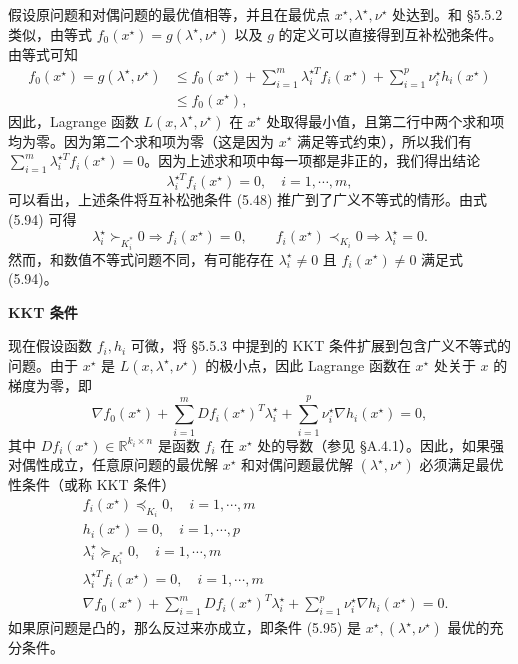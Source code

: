 \documentclass[UTF8, 12pt, fontset=fandol, oneside]{ctexart}
\begin{document}
假设原问题和对偶问题的最优值相等，并且在最优点 $x^\star,\lambda^\star,\nu^\star$ 处达到。和 §5.5.2 类似，由等式 $f_0(x^\star)=g(\lambda^\star,\nu^\star)$ 以及 $g$ 的定义可以直接得到互补松弛条件。由等式可知
\[
\begin{aligned}
f_0(x^\star)=g(\lambda^\star,\nu^\star)
&\leq f_0(x^\star)+\sum_{i=1}^m\lambda_i^{\star T}f_i(x^\star)+\sum_{i=1}^p\nu_i^\star h_i(x^\star)\\
&\leq f_0(x^\star),
\end{aligned}
\]
因此，Lagrange 函数 $L(x,\lambda^\star,\nu^\star)$ 在 $x^\star$ 处取得最小值，且第二行中两个求和项均为零。因为第二个求和项为零（这是因为 $x^\star$ 满足等式约束），所以我们有 $\sum_{i=1}^m\lambda_i^{\star T}f_i(x^\star)=0$。因为上述求和项中每一项都是非正的，我们得出结论
\begin{equation}
\lambda_i^{\star T}f_i(x^\star)=0,\quad i=1,\cdots,m,
\tag{5.94}
\end{equation}
可以看出，上述条件将互补松弛条件 (5.48) 推广到了广义不等式的情形。由式 (5.94) 可得
\[
\lambda_i^\star\succ_{K_i^\ast}0\Longrightarrow f_i(x^\star)=0,\qquad
f_i(x^\star)\prec_{K_i}0\Longrightarrow \lambda_i^\star=0.
\]
然而，和数值不等式问题不同，有可能存在 $\lambda_i^\star\neq 0$ 且 $f_i(x^\star)\neq 0$ 满足式 (5.94)。

\noindent\textbf{KKT 条件}

现在假设函数 $f_i,h_i$ 可微，将 §5.5.3 中提到的 KKT 条件扩展到包含广义不等式的问题。由于 $x^\star$ 是 $L(x,\lambda^\star,\nu^\star)$ 的极小点，因此 Lagrange 函数在 $x^\star$ 处关于 $x$ 的梯度为零，即
\[
\nabla f_0(x^\star)+\sum_{i=1}^m Df_i(x^\star)^T\lambda_i^\star+\sum_{i=1}^p\nu_i^\star\nabla h_i(x^\star)=0,
\]
其中 $Df_i(x^\star)\in\mathbb{R}^{k_i\times n}$ 是函数 $f_i$ 在 $x^\star$ 处的导数（参见 §A.4.1）。因此，如果强对偶性成立，任意原问题的最优解 $x^\star$ 和对偶问题最优解 $(\lambda^\star,\nu^\star)$ 必须满足最优性条件（或称 KKT 条件）
\begin{equation}
\begin{aligned}
& f_i(x^\star)\preceq_{K_i}0,\quad i=1,\cdots,m\\
& h_i(x^\star)=0,\quad i=1,\cdots,p\\
& \lambda_i^\star\succeq_{K_i^\ast}0,\quad i=1,\cdots,m\\
& \lambda_i^{\star T}f_i(x^\star)=0,\quad i=1,\cdots,m\\
& \nabla f_0(x^\star)+\sum_{i=1}^m Df_i(x^\star)^T\lambda_i^\star+\sum_{i=1}^p\nu_i^\star\nabla h_i(x^\star)=0.
\end{aligned}
\tag{5.95}
\end{equation}
如果原问题是凸的，那么反过来亦成立，即条件 (5.95) 是 $x^\star,(\lambda^\star,\nu^\star)$ 最优的充分条件。
\end{document}
